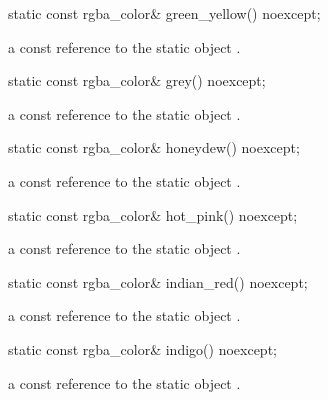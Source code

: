 \begin{itemdecl}
static const rgba_color& green_yellow() noexcept;
\end{itemdecl}
\begin{itemdescr}
\pnum
\returns
a const reference to the static  object .
\end{itemdescr}

\begin{itemdecl}
static const rgba_color& grey() noexcept;
\end{itemdecl}
\begin{itemdescr}
\pnum
\returns
a const reference to the static  object .
\end{itemdescr}

\begin{itemdecl}
static const rgba_color& honeydew() noexcept;
\end{itemdecl}
\begin{itemdescr}
\pnum
\returns
a const reference to the static  object .
\end{itemdescr}

\begin{itemdecl}
static const rgba_color& hot_pink() noexcept;
\end{itemdecl}
\begin{itemdescr}
\pnum
\returns
a const reference to the static  object .
\end{itemdescr}

\begin{itemdecl}
static const rgba_color& indian_red() noexcept;
\end{itemdecl}
\begin{itemdescr}
\pnum
\returns
a const reference to the static  object .
\end{itemdescr}

\begin{itemdecl}
static const rgba_color& indigo() noexcept;
\end{itemdecl}
\begin{itemdescr}
\pnum
\returns
a const reference to the static  object .
\end{itemdescr}

